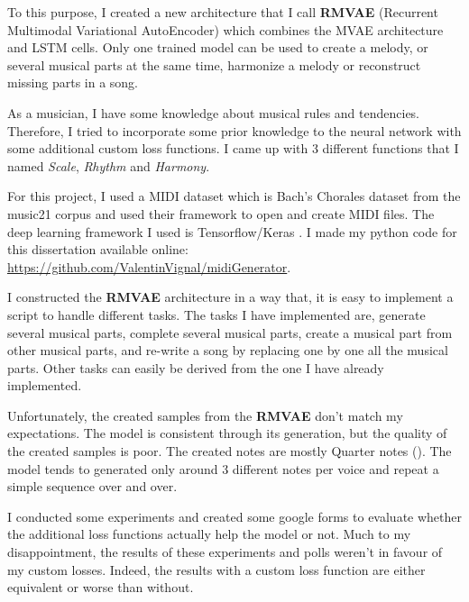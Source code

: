 \documentclass[12pt]{report}
\begin{document}
To this purpose, I created a new architecture that I call \textbf{RMVAE} (Recurrent Multimodal Variational AutoEncoder) which combines the MVAE architecture \cite{wu_multimodal_2018} and LSTM cells.
Only one trained model can be used to create a melody, or several musical parts at the same time, harmonize a melody or reconstruct missing parts in a song.

As a musician, I have some knowledge about musical rules and tendencies.
Therefore, I tried to incorporate some prior knowledge to the neural network with some additional custom loss functions.
I came up with 3 different functions that I named \textit{Scale}, \textit{Rhythm} and \textit{Harmony}.

For this project, I used a MIDI dataset which is Bach's Chorales dataset from the music21 corpus \cite{noauthor_music21corpuschorales_nodate} and used their framework \cite{noauthor_music21_nodate} to open and create MIDI files.
The deep learning framework I used is Tensorflow/Keras \cite{noauthor_tensorflow_nodate, noauthor_keras_nodate}.
I made my python code for this dissertation available online: \url{https://github.com/ValentinVignal/midiGenerator}.

I constructed the \textbf{RMVAE} architecture in a way that, it is easy to implement a script to handle different tasks.
The tasks I have implemented are, generate several musical parts, complete several musical parts, create a musical part from other musical parts, and re-write a song by replacing one by one all the musical parts.
Other tasks can easily be derived from the one I have already implemented.

Unfortunately, the created samples from the \textbf{RMVAE} don't match my expectations.
The model is consistent through its generation, but the quality of the created samples is poor.
The created notes are mostly Quarter notes (\musQuarter).
The model tends to generated only around 3 different notes per voice and repeat a simple sequence over and over.

I conducted some experiments and created some google forms to evaluate whether the additional loss functions actually help the model or not.
Much to my disappointment, the results of these experiments and polls weren't in favour of my custom losses.
Indeed, the results with a custom loss function are either equivalent or worse than without.


\end{document}

